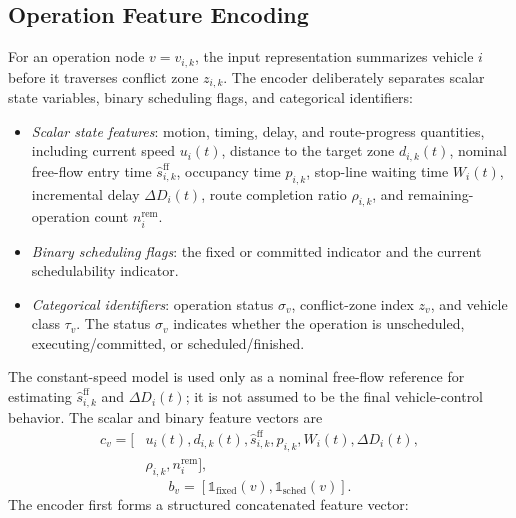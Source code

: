 \subsection{Operation Feature Encoding}
\begin{addedtwoblock}
For an operation node $v=v_{i,k}$, the input representation summarizes vehicle $i$ before it traverses conflict zone $z_{i,k}$. The encoder deliberately separates scalar state variables, binary scheduling flags, and categorical identifiers:
\begin{itemize}
  \item \textit{Scalar state features}: motion, timing, delay, and route-progress quantities, including current speed $u_i(t)$, distance to the target zone $d_{i,k}(t)$, nominal free-flow entry time $\hat{s}^{\mathrm{ff}}_{i,k}$, occupancy time $p_{i,k}$, stop-line waiting time $W_i(t)$, incremental delay $\Delta D_i(t)$, route completion ratio $\rho_{i,k}$, and remaining-operation count $n_i^{\mathrm{rem}}$.
  \item \textit{Binary scheduling flags}: the fixed or committed indicator and the current schedulability indicator.
  \item \textit{Categorical identifiers}: operation status $\sigma_v$, conflict-zone index $z_v$, and vehicle class $\tau_v$. The status $\sigma_v$ indicates whether the operation is unscheduled, executing/committed, or scheduled/finished.
\end{itemize}
The constant-speed model is used only as a nominal free-flow reference for estimating $\hat{s}^{\mathrm{ff}}_{i,k}$ and $\Delta D_i(t)$; it is not assumed to be the final vehicle-control behavior. The scalar and binary feature vectors are
\begin{equation}
\begin{aligned}
  c_v = [&u_i(t), d_{i,k}(t), \hat{s}^{\mathrm{ff}}_{i,k}, p_{i,k}, W_i(t), \Delta D_i(t), \\
  &\rho_{i,k}, n_i^{\mathrm{rem}}],
\end{aligned}
\label{eq:continuous_features}
\end{equation}
\begin{equation}
  b_v=[\mathbb{1}_{\mathrm{fixed}}(v),\mathbb{1}_{\mathrm{sched}}(v)].
  \label{eq:binary_features}
\end{equation}
The encoder first forms a structured concatenated feature vector:
\begin{equation}
\begin{aligned}

\end{aligned}
\end{equation}
\end{addedtwoblock}
